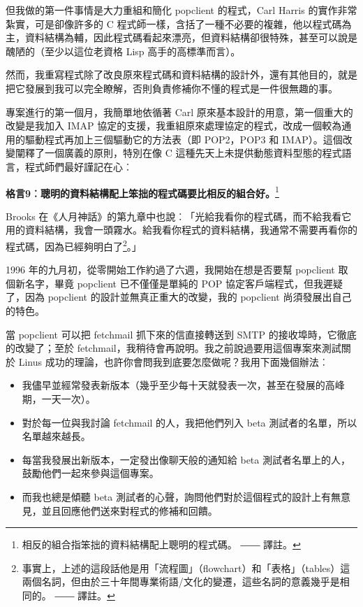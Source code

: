 \documentclass[12pt, a5paper]{book}
\begin{document}
但我做的第一件事情是大力重組和簡化 popclient 的程式，Carl Harris
的實作非常紮實，可是卻像許多的 C
程式師一樣，含括了一種不必要的複雜，他以程式碼為主，資料結構為輔，因此程式碼看起來漂亮，但資料結構卻很特殊，甚至可以說是醜陋的（至少以這位老資格
Lisp 高手的高標準而言）。

然而，我重寫程式除了改良原來程式碼和資料結構的設計外，還有其他目的，就是把它發展到我可以完全瞭解，否則負責修補你不懂的程式是一件很無趣的事。

專案進行的第一個月，我簡單地依循著 Carl
原來基本設計的用意，第一個重大的改變是我加入 IMAP
協定的支援，我重組原來處理協定的程式，改成一個較為通用的驅動程式再加上三個驅動它的方法表（即
POP2，POP3 和 IMAP）。這個改變闡釋了一個廣義的原則，特別在像 C
這種先天上未提供動態資料型態的程式語言，程式師們最好謹記在心︰

\textbf{格言9︰聰明的資料結構配上笨拙的程式碼要比相反的組合好。}\footnote{相反的組合指笨拙的資料結構配上聰明的程式碼。
  ―― 譯註。}

Brooks
在《人月神話》的第九章中也說︰「光給我看你的程式碼，而不給我看它用的資料結構，我會一頭霧水。給我看你程式的資料結構，我通常不需要再看你的程式碼，因為已經夠明白了\footnote{事實上，上述的這段話他是用「流程圖」（flowchart）和「表格」（tables）這兩個名詞，但由於三十年間專業術語/文化的變遷，這些名詞的意義幾乎是相同的。
  ―― 譯註。}。」

1996 年的九月初，從零開始工作約過了六週，我開始在想是否要幫 popclient
取個新名字，畢竟 popclient 已不僅僅是單純的 POP
協定客戶端程式，但我遲疑了，因為 popclient
的設計並無真正重大的改變，我的 popclient 尚須發展出自己的特色。

當 popclient 可以把 fetchmail 抓下來的信直接轉送到 SMTP
的接收埠時，它徹底的改變了；至於
fetchmail，我稍待會再說明。我之前說過要用這個專案來測試關於 Linus
成功的理論，也許你會問我到底要怎麼做呢？我用下面幾個辦法︰

\begin{itemize}
\itemsep1pt\parskip0pt
\item
  我儘早並經常發表新版本（幾乎至少每十天就發表一次，甚至在發展的高峰期，一天一次）。
\item
  對於每一位與我討論 fetchmail 的人，我把他們列入 beta
  測試者的名單，所以名單越來越長。
\item
  每當我發展出新版本，一定發出像聊天般的通知給 beta
  測試者名單上的人，鼓勵他們一起來參與這個專案。
\item
  而我也總是傾聽 beta
  測試者的心聲，詢問他們對於這個程式的設計上有無意見，並且回應他們送來對程式的修補和回饋。
\end{itemize}
\end{document}
